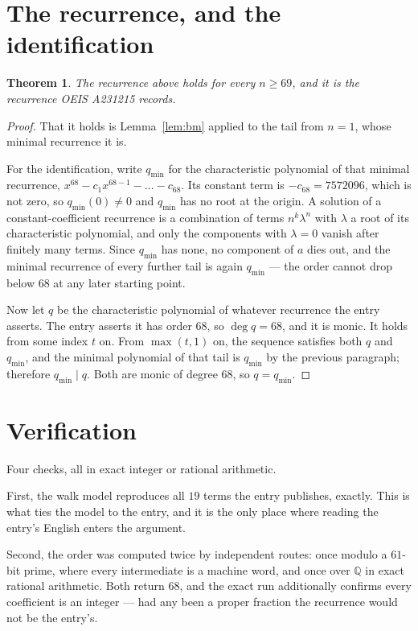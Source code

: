 \documentclass[11pt,a4paper]{article}
\theoremstyle{plain}
\newtheorem{theorem}{Theorem}
\theoremstyle{definition}
\begin{document}
\section{The recurrence, and the identification}

\begin{theorem}
The recurrence above holds for every $n\ge69$, and it is the recurrence OEIS A231215 records.
\end{theorem}

\begin{proof}
That it holds is Lemma~\ref{lem:bm} applied to the tail from $n=1$, whose minimal
recurrence it is.

For the identification, write $q_{\min}$ for the characteristic polynomial of that minimal
recurrence, $x^{68}-c_1x^{68-1}-\dots-c_{68}$. Its constant term is
$-c_{68}=7572096$, which is not zero, so $q_{\min}(0)\neq0$ and $q_{\min}$ has no
root at the origin. A solution of a constant-coefficient recurrence is a combination of terms
$n^{k}\lambda^{n}$ with $\lambda$ a root of its characteristic polynomial, and only the
components with $\lambda=0$ vanish after finitely many terms. Since $q_{\min}$ has none, no
component of $a$ dies out, and the minimal recurrence of every further tail is again
$q_{\min}$ --- the order cannot drop below $68$ at any later starting point.

Now let $q$ be the characteristic polynomial of whatever recurrence the entry asserts. The
entry asserts it has order $68$, so $\deg q=68$, and it is monic. It holds from some
index $t$ on. From $\max(t,1)$ on, the sequence satisfies both $q$ and $q_{\min}$, and
the minimal polynomial of that tail is $q_{\min}$ by the previous paragraph; therefore
$q_{\min}\mid q$. Both are monic of degree $68$, so $q=q_{\min}$.
\end{proof}

\section{Verification}

Four checks, all in exact integer or rational arithmetic.

First, the walk model reproduces all $19$ terms the entry publishes, exactly. This is
what ties the model to the entry, and it is the only place where reading the entry's English
enters the argument.

Second, the order was computed twice by independent routes: once modulo a $61$-bit prime, where
every intermediate is a machine word, and once over $\mathbb{Q}$ in exact rational arithmetic.
Both return $68$, and the exact run additionally confirms every coefficient is an integer
--- had any been a proper fraction the recurrence would not be the entry's.
\end{document}
